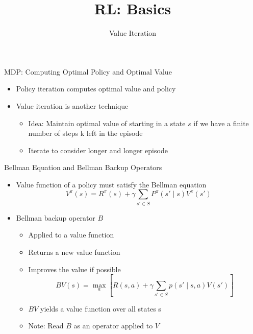 


\title[Reinforcement Learning: Basics]{RL: Basics}
\subtitle{Value Iteration}




	
	\maketitle

\begin{frame}[c]{MDP: Computing Optimal Policy and Optimal Value}

\begin{itemize}
	\item Policy iteration computes optimal value and policy
	\item Value iteration is another technique
	\begin{itemize}
		\item Idea: Maintain optimal value of starting in a state $s$ if we have a finite 	number of steps k left in the episode
		\item Iterate to consider longer and longer episode
	\end{itemize}

\end{itemize}

\end{frame}
\begin{frame}[c]{Bellman Equation and Bellman Backup Operators}

\begin{itemize}
	\item Value function of a policy must satisfy the Bellman equation
	$$V^\pi (s) = R^\pi (s) + \gamma \sum_{s' \in S}  P^\pi(s' \mid s ) V^\pi (s') $$
	\item Bellman backup operator $B$
	\begin{itemize}
		\item Applied to a value function
		 \item 	Returns a new value function
		 \item 	Improves the value if possible
		 $$ BV(s) = \max_{a} [ R(s,a) + \gamma \sum_{s' \in S} p(s' \mid s,a)  V(s')  ]$$
		 \item $BV$ yields a value function over all states s
		 \item Note: Read $B$ as an operator applied to $V$
	\end{itemize}
	
\end{itemize}

\end{frame}
